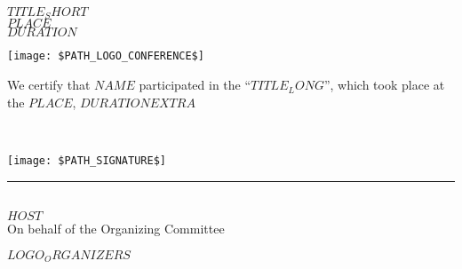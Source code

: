 \documentclass[12pt,landscape]{article}
\begin{document}

\begin{center}
{ \sc \color{customcolor} $TITLE_SHORT$}\\[5pt]
{ \sc $PLACE$}\\
{ \sc $DURATION$}\\
\end{center}

\begin{center}
\texttt{[image: \$PATH\_LOGO\_CONFERENCE\$]}
\end{center}


\begin{center}
\begin{minipage}{0.7\textwidth}
We certify that $NAME$ participated in the ``$TITLE_LONG$'', which took place at the $PLACE$,
$DURATION$$EXTRA$
\end{minipage}
\end{center}

\begin{center}
\begin{minipage}{0.15\textwidth}
~
\end{minipage}
\begin{minipage}{0.4\textwidth}
\hskip 20pt\texttt{[image: \$PATH\_SIGNATURE\$]}\\
\rule{8cm}{1pt}\\[5pt]
$HOST$\\
On behalf of the Organizing Committee
\end{minipage}
\begin{minipage}{0.4\textwidth}
$LOGO_ORGANIZERS$
\end{minipage}
\end{center}
\end{document}
